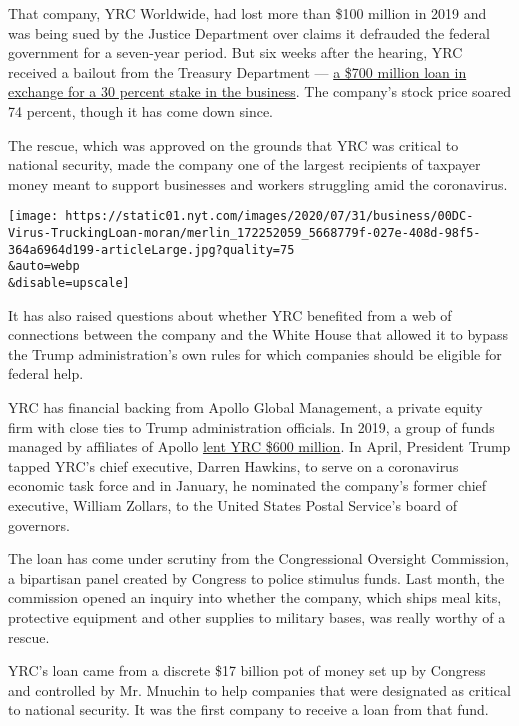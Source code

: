 That company, YRC Worldwide, had lost more than \$100 million in 2019
and was being sued by the Justice Department over claims it defrauded
the federal government for a seven-year period. But six weeks after the
hearing, YRC received a bailout from the Treasury Department ---
\href{https://home.treasury.gov/system/files/136/YRC-Transaction-Summary.pdf}{a
\$700 million loan in exchange for a 30 percent stake in the business}.
The company's stock price soared 74 percent, though it has come down
since.

The rescue, which was approved on the grounds that YRC was critical to
national security, made the company one of the largest recipients of
taxpayer money meant to support businesses and workers struggling amid
the coronavirus.

\texttt{[image: https://static01.nyt.com/images/2020/07/31/business/00DC-Virus-TruckingLoan-moran/merlin\_172252059\_5668779f-027e-408d-98f5-364a6964d199-articleLarge.jpg?quality=75\\\&auto=webp\\\&disable=upscale]}

It has also raised questions about whether YRC benefited from a web of
connections between the company and the White House that allowed it to
bypass the Trump administration's own rules for which companies should
be eligible for federal help.

YRC has financial backing from Apollo Global Management, a private
equity firm with close ties to Trump administration officials. In 2019,
a group of funds managed by affiliates of Apollo
\href{http://investors.yrcw.com/news-releases/news-release-details/yrc-worldwide-announces-new-term-loan-agreement}{lent
YRC \$600 million}. In April, President Trump tapped YRC's chief
executive, Darren Hawkins, to serve on a coronavirus economic task force
and in January, he nominated the company's former chief executive,
William Zollars, to the United States Postal Service's board of
governors.

The loan has come under scrutiny from the Congressional Oversight
Commission, a bipartisan panel created by Congress to police stimulus
funds. Last month, the commission opened an inquiry into whether the
company, which ships meal kits, protective equipment and other supplies
to military bases, was really worthy of a rescue.

YRC's loan came from a discrete \$17 billion pot of money set up by
Congress and controlled by Mr. Mnuchin to help companies that were
designated as critical to national security. It was the first company to
receive a loan from that fund.

